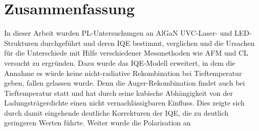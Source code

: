 
\chapter{Zusammenfassung}

\thispagestyle{fancy}


In dieser Arbeit wurden PL-Untersuchungen an AlGaN UVC-Laser- und LED-Strukturen durchgeführt und deren IQE bestimmt, verglichen und die Ursachen für die Unterschiede mit Hilfe verschiedener Messmethoden wie AFM und CL versucht zu ergründen. Dazu wurde das IQE-Modell erweitert, in dem die Annahme es würde keine nicht-radiative Rekombination bei Tieftemperatur geben, fallen gelassen wurde. Denn die Auger-Rekombination findet auch bei Tieftemperatur statt und hat durch seine kubische Abhängigkeit von der Ladungsträgerdichte einen nicht vernachlässigbaren Einfluss. Dies zeigte sich durch damit eingehende deutliche Korrekturen der IQE, die zu deutlich geringeren Werten führte.
Weiter wurde die Polarisation an 